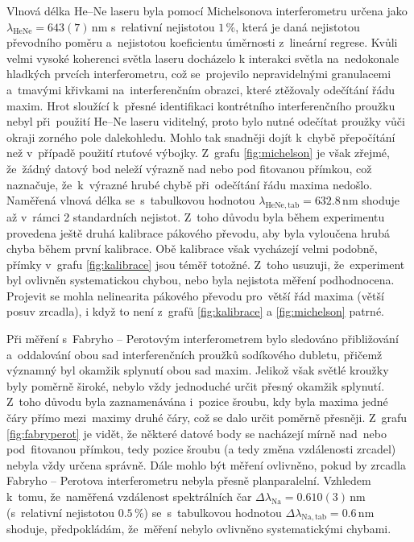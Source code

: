 \documentclass{../concepts/titul_protokol_p/prepareprotokol} %
\begin{document}
Vlnová délka He--Ne laseru byla pomocí Michelsonova interferometru určena
jako $\lambda_\mathrm{HeNe} = 643(7)\,\unit{\nm}$ s~relativní nejistotou $1\,\%$, která je daná
nejistotou převodního poměru a~nejistotou koeficientu úměrnosti z~lineární regrese. Kvůli velmi vysoké
koherenci světla laseru docházelo k interakci světla na~nedokonale hladkých prvcích interferometru,
což se~projevilo nepravidelnými granulacemi a~tmavými křivkami na~interferenčním obrazci, které
ztěžovaly odečítání řádu maxim. Hrot sloužící k~přesné identifikaci kontrétního interferenčního proužku
nebyl při~použití He--Ne laseru viditelný, proto bylo nutné odečítat proužky vůči okraji zorného pole dalekohledu.
Mohlo tak snadněji dojít k~chybě přepočítání než v~případě použití rtuťové výbojky. Z~grafu \ref{fig:michelson}
je však zřejmé, že~žádný datový bod neleží výrazně nad nebo pod fitovanou přímkou, což naznačuje,
že~k~výrazné hrubé chybě při~odečítání řádu maxima nedošlo.
Naměřená vlnová délka se~s~tabulkovou hodnotou $\lambda_\mathrm{HeNe,tab} = 632.8\,\unit{\nm}$ \cite{wiki}
shoduje až v~rámci 2 standardních nejistot. Z~toho důvodu byla během experimentu provedena ještě druhá kalibrace
pákového převodu, aby byla vyloučena hrubá chyba během první kalibrace. Obě kalibrace však vycházejí velmi podobně,
přímky v~grafu \ref{fig:kalibrace} jsou téměř totožné. Z~toho usuzuji, že~experiment byl ovlivněn
systematickou chybou, nebo byla nejistota měření podhodnocena. Projevit se mohla nelinearita pákového převodu
pro~větší řád maxima (větší posuv zrcadla), i když to není z~grafů \ref{fig:kalibrace} a \ref{fig:michelson}
patrné.

Při měření s~Fabryho -- Perotovým interferometrem bylo sledováno přibližování a~oddalování obou sad
interferenčních proužků sodíkového dubletu, přičemž významný byl okamžik splynutí obou sad maxim.
Jelikož však světlé kroužky byly poměrně široké, nebylo vždy jednoduché určit přesný okamžik splynutí.
Z~toho důvodu byla zaznamenávána i~pozice šroubu, kdy byla maxima jedné čáry přímo mezi~maximy druhé čáry,
což se dalo určit poměrně přesněji. Z~grafu \ref{fig:fabryperot} je vidět, že některé datové body
se nacházejí mírně nad~nebo pod~fitovanou přímkou, tedy pozice šroubu (a tedy změna vzdálenosti zrcadel)
nebyla vždy určena správně. Dále mohlo být měření ovlivněno, pokud by zrcadla Fabryho -- Perotova interferometru
nebyla přesně planparalelní. Vzhledem k~tomu, že~naměřená vzdálenost spektrálních čar
$\Delta \lambda_{\mathrm{Na}} = 0.610(3)\,\unit{\nm}$ (s~relativní nejistotou $0.5\,\%$) se~s~tabulkovou
hodnotou $\Delta \lambda_{\mathrm{Na,tab}} = 0.6\,\unit{\nm}$ \cite{pokyny3} shoduje, předpokládám,
že~měření nebylo ovlivněno systematickými chybami.
\end{document}
